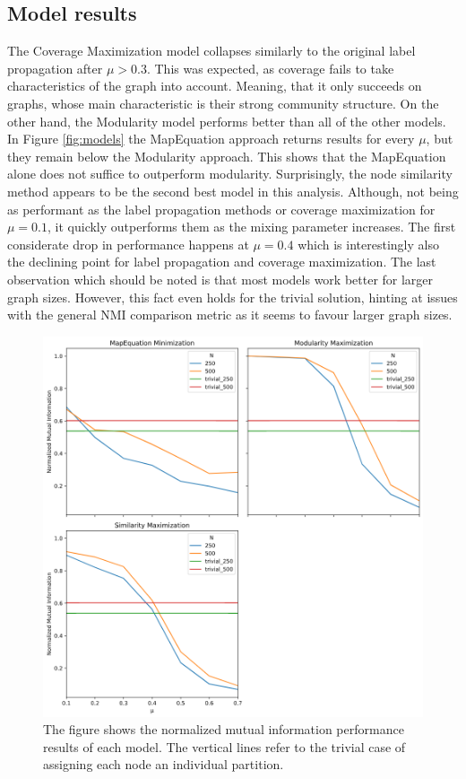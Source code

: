 \documentclass[11pt, twocolumn]{article}
\begin{document}
\subsection{Model results}
The Coverage Maximization model collapses similarly to the original label propagation after $\mu>0.3$. This was expected, as coverage fails to take characteristics of the graph into account. Meaning, that it only succeeds on graphs, whose main characteristic is their strong community structure. On the other hand, the Modularity model performs better than all of the other models. In Figure \autoref{fig:models} the MapEquation approach returns results for every $\mu$, but they remain below the Modularity approach. This shows that the MapEquation alone does not suffice to outperform modularity. Surprisingly, the node similarity method appears to be the second best model in this analysis. Although, not being as performant as the label propagation methods or coverage maximization for $\mu=0.1$, it quickly outperforms them as the mixing parameter increases. The first considerate drop in performance happens at $\mu=0.4$ which is interestingly also the declining point for label propagation and coverage maximization. The last observation which should be noted is that most models work better for larger graph sizes. However, this fact even holds for the trivial solution, hinting at issues with the general NMI comparison metric as it seems to favour larger graph sizes.

\begin{figure}[h]
  \includegraphics[width=\linewidth]{models.png}
  \caption{The figure shows the normalized mutual information performance results of each model. The vertical lines refer to the trivial case of assigning each node an individual partition.}
  \label{fig:models}
\end{figure}
\end{document}
